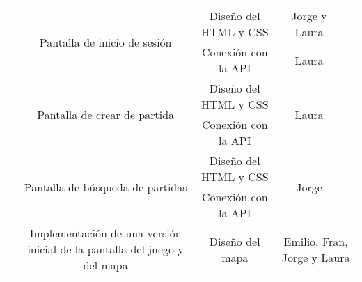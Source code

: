 \documentclass[11pt, a4paper, titlepage]{article}
\begin{document}
\begin{landscape}
\begin{table}[hbt!]
\begin{tabular}{c|ccll|cc|}
\multicolumn{1}{|c|}{}                            & \multicolumn{1}{c|}{\multirow{2}{*}{Pantalla de inicio de sesión}}                                              & \multicolumn{3}{c|}{Diseño del HTML y CSS}                                                                     & \multicolumn{1}{c|}{Jorge y Laura}          &                                \\ \cline{3-6}
\multicolumn{1}{|c|}{}                            & \multicolumn{1}{c|}{}                                                                                           & \multicolumn{3}{c|}{Conexión con la API}                                                                       & \multicolumn{1}{c|}{Laura}                  &                                \\ \cline{2-6}
\multicolumn{1}{|c|}{}                            & \multicolumn{1}{c|}{\multirow{2}{*}{Pantalla de crear de partida}}                                              & \multicolumn{3}{c|}{Diseño del HTML y CSS}                                                                     & \multicolumn{1}{c|}{\multirow{2}{*}{Laura}} &                                \\ \cline{3-5}
\multicolumn{1}{|c|}{}                            & \multicolumn{1}{c|}{}                                                                                           & \multicolumn{3}{c|}{Conexión con la API}                                                                       & \multicolumn{1}{c|}{}                       &                                \\ \cline{2-6}
\multicolumn{1}{|c|}{}                            & \multicolumn{1}{c|}{\multirow{2}{*}{Pantalla de búsqueda de partidas}}                                          & \multicolumn{3}{c|}{Diseño del HTML y CSS}                                                                     & \multicolumn{1}{c|}{\multirow{2}{*}{Jorge}} &                                \\ \cline{3-5}
\multicolumn{1}{|c|}{}                            & \multicolumn{1}{c|}{}                                                                                           & \multicolumn{3}{c|}{Conexión con la API}                                                                       & \multicolumn{1}{c|}{}                       &                                \\ \cline{2-7} 
\multicolumn{1}{|c|}{}                            & \multicolumn{1}{c|}{\multirow{5}{*}{Implementación de una versión inicial de la pantalla del juego y del mapa}} & \multicolumn{3}{c|}{Diseño del mapa}                                                                           & \multicolumn{2}{c|}{Emilio, Fran, Jorge y Laura}                             \\ \cline{3-7} 

\end{tabular}
\end{table}
\end{landscape}
\end{document}

